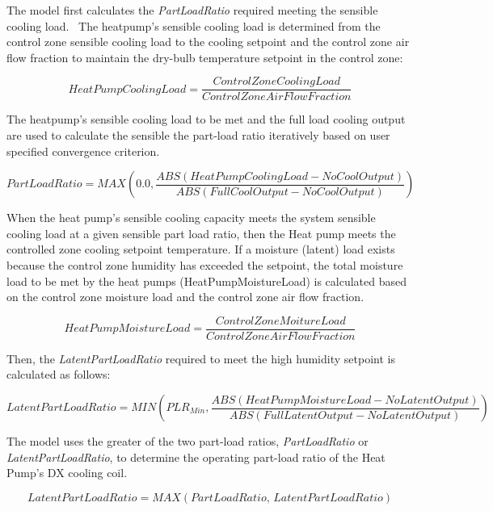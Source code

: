 The model first calculates the \emph{PartLoadRatio} required meeting the sensible cooling load.~ The heatpump's sensible cooling load is determined from the control zone sensible cooling load to the cooling setpoint and the control zone air flow fraction to maintain the dry-bulb temperature setpoint in the control zone:

\begin{equation}
HeatPumpCoolingLoad = \frac{{ControlZoneCoolingLoad}}{{ControlZoneAirFlowFraction}}
\end{equation}

The heatpump's sensible cooling load to be met and the full load cooling output are used to calculate the sensible the part-load ratio iteratively based on user specified convergence criterion.

\begin{equation}
PartLoadRatio = MAX\left( {0.0, \frac{{ABS\left( {HeatPumpCoolingLoad - NoCoolOutput} \right)}}{{ABS\left( {FullCoolOutput - NoCoolOutput} \right)}}} \right)
\end{equation}

When the heat pump's sensible cooling capacity meets the system sensible cooling load at a given sensible part load ratio, then the Heat pump meets the controlled zone cooling setpoint temperature. If a moisture (latent) load exists because the control zone humidity has exceeded the setpoint, the total moisture load to be met by the heat pumps (HeatPumpMoistureLoad) is calculated based on the control zone moisture load and the control zone air flow fraction.

\begin{equation}
HeatPumpMoistureLoad = \frac{{ControlZoneMoitureLoad}}{{ControlZoneAirFlowFraction}}
\end{equation}

Then, the \emph{LatentPartLoadRatio} required to meet the high humidity setpoint is calculated as follows:

\begin{equation}
LatentPartLoadRatio = MIN\left( {PL{R_{Min}}, \frac{{ABS\left( {HeatPumpMoistureLoad - NoLatentOutput} \right)}}{{ABS\left( {FullLatentOutput - NoLatentOutput} \right)}}} \right)
\end{equation}

The model uses the greater of the two part-load ratios, \emph{PartLoadRatio} or \emph{LatentPartLoadRatio}, to determine the operating part-load ratio of the Heat Pump's DX cooling coil.

\begin{equation}
LatentPartLoadRatio = MAX\left( {PartLoadRatio,\,LatentPartLoadRatio} \right)
\end{equation}

